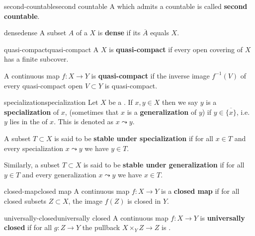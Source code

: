 \begin{topic}{second-countable}{second countable}
    A  which admits a countable  is called \textbf{second countable}.
\end{topic}

\begin{topic}{dense}{dense}
    A subset $A$ of a  $X$ is \textbf{dense} if its  $\overline{A}$ equals $X$.
\end{topic}

\begin{topic}{quasi-compact}{quasi-compact}
    A  $X$ is \textbf{quasi-compact} if every open covering of $X$ has a finite subcover.
    
    A continuous map $f : X \to Y$ is \textbf{quasi-compact} if the inverse image $f^{-1}(V)$ of every quasi-compact open $V \subset Y$ is quasi-compact.
\end{topic}

\begin{topic}{specialization}{specialization}
    Let $X$ be a . If $x, y \in X$ then we say $y$ is a \textbf{specialization} of $x$, (sometimes that $x$ is a \textbf{generalization} of $y$) if $y \in \overline{\{ x \}}$, i.e. $y$ lies in the  of $x$. This is denoted as $x \leadsto y$.
    
    A subset $T \subset X$ is said to be \textbf{stable under specialization} if for all $x \in T$ and every specialization $x \leadsto y$ we have $y \in T$.
    
    Similarly, a subset $T \subset X$ is said to be \textbf{stable under generalization} if for all $y \in T$ and every generalization $x \leadsto y$ we have $x \in T$.
\end{topic}

\begin{topic}{closed-map}{closed map}
    A continuous map $f : X \to Y$ is a \textbf{closed map} if for all closed subsets $Z \subset X$, the image $f(Z)$ is closed in $Y$.
\end{topic}

\begin{topic}{universally-closed}{universally closed}
    A continuous map $f : X \to Y$ is \textbf{universally closed} if for all $g : Z \to Y$ the pullback $X \times_Y Z \to Z$ is .
\end{topic}

